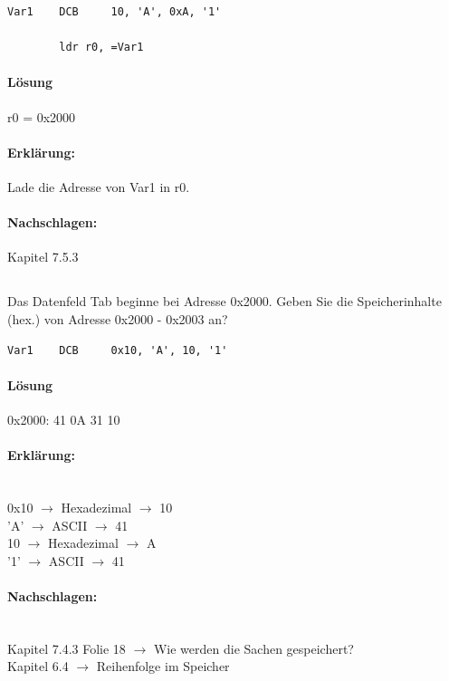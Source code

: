 \documentclass[12pt,twoside,a4paper]{article}
\begin{document}
\begin{lstlisting}
Var1 	DCB 	10, 'A', 0xA, '1'

		ldr r0, =Var1
\end{lstlisting}

\paragraph*{Lösung}
r0 = 0x2000

\paragraph*{Erklärung:}
Lade die Adresse von Var1 in r0. 


\paragraph*{Nachschlagen:}
Kapitel 7.5.3

\subsection{}
Das Datenfeld Tab beginne bei Adresse 0x2000. Geben Sie die Speicherinhalte (hex.) von Adresse 0x2000 - 0x2003 an?\\
\begin{lstlisting}
Var1 	DCB 	0x10, 'A', 10, '1'
\end{lstlisting}

\paragraph*{Lösung}
0x2000: 41 0A 31 10 \\


\paragraph*{Erklärung:}
\\
0x10 $\rightarrow$ Hexadezimal $\rightarrow$ 10\\
'A' $\rightarrow$ ASCII $\rightarrow$ 41\\
10 $\rightarrow$ Hexadezimal $\rightarrow$ A\\
'1' $\rightarrow$ ASCII $\rightarrow$ 41\\

\paragraph*{Nachschlagen:}\\
Kapitel 7.4.3 Folie 18 $\rightarrow$ Wie werden die Sachen gespeichert?\\
Kapitel 6.4 $\rightarrow$ Reihenfolge im Speicher\\
\end{document}
